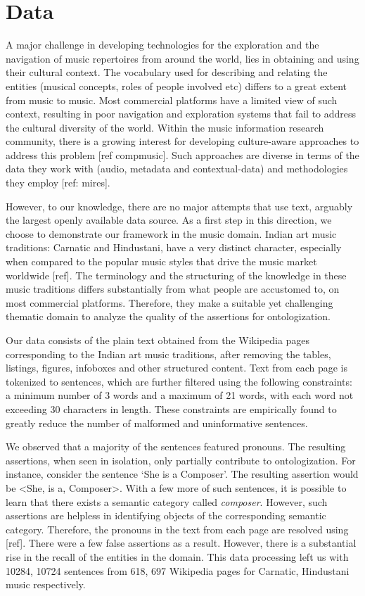 \documentclass{llncs}
\begin{document}
\section{Data}
\label{sec:data}
A major challenge in developing technologies for the exploration and the navigation of music repertoires from around the world, lies in obtaining and using their cultural context. The vocabulary used for describing and relating the entities (musical concepts, roles of people involved etc) differs to a great extent from music to music. Most commercial platforms have a limited view of such context, resulting in poor navigation and exploration systems that fail to address the cultural diversity of the world.  Within the music information research community, there is a growing interest for developing culture-aware approaches to address this problem [ref compmusic]. Such approaches are diverse in terms of the data they work with (audio, metadata and contextual-data) and methodologies they employ [ref: mires]. 

However, to our knowledge, there are no major attempts that use text, arguably the largest openly available data source. As a first step in this direction, we choose to demonstrate our framework in the music domain. Indian art music traditions: Carnatic and Hindustani, have a very distinct character, especially when compared to the popular music styles that drive the music market worldwide [ref]. The terminology and the structuring of the knowledge in these music traditions differs substantially from what people are accustomed to, on most commercial platforms. Therefore, they make a suitable yet challenging thematic domain to analyze the quality of the assertions for ontologization. 

Our data consists of the plain text obtained from the Wikipedia pages corresponding to the Indian art music traditions, after removing the tables, listings, figures, infoboxes and other structured content. Text from each page is tokenized to sentences, which are further filtered using the following constraints: a minimum number of 3 words and a maximum of 21 words, with each word not exceeding 30 characters in length. These constraints are empirically found to greatly reduce the number of malformed and uninformative sentences. 

We observed that a majority of the sentences featured pronouns. The resulting assertions, when seen in isolation, only partially contribute to ontologization. For instance, consider the sentence `She is a Composer'. The resulting assertion would be <She, is a, Composer>. With a few more of such sentences, it is possible to learn that there exists a semantic category called \textit{composer}. However, such assertions are helpless in identifying objects of the corresponding semantic category. Therefore, the pronouns in the text from each page are resolved using [ref]. There were a few false assertions as a result. However, there is a substantial rise in the recall of the entities in the domain. This data processing left us with 10284, 10724 sentences from 618, 697 Wikipedia pages for Carnatic, Hindustani music respectively.
\end{document}
